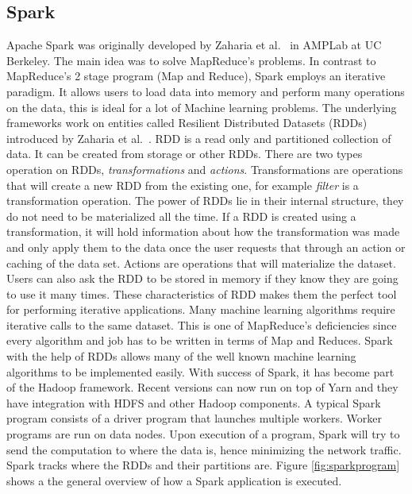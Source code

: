 \documentclass[english]{tktltiki}
\begin{document}
\subsection{Spark}
Apache Spark  was originally developed by Zaharia et al.\ \cite{zaharia10} in AMPLab at UC Berkeley. The main idea was to solve MapReduce's problems. In contrast to MapReduce's 2 stage program (Map and Reduce), Spark employs an iterative paradigm. It allows users to load data into memory and perform many operations on the data, this is ideal for a lot of Machine learning problems. The underlying frameworks work on entities called Resilient Distributed Datasets (RDDs) introduced by Zaharia et al.\ \cite{zaharia12}. RDD is a read only and partitioned collection of data. It can be created from storage or other RDDs. There are two types operation on RDDs, \textit{transformations} and \textit{actions}. Transformations are operations that will create a new RDD from the existing one, for example \textit{filter} is a transformation operation. The power of RDDs lie in their internal structure, they do not need to be materialized all the time. If a RDD is created using a transformation, it will hold information about how the transformation was made and only apply them to the data once the user requests that through an action or caching of the data set. Actions are operations that will materialize the dataset. Users can also ask the RDD to be stored in memory if they know they are going to use it many times. These characteristics of RDD makes them the perfect tool for performing iterative applications. Many machine learning algorithms require iterative calls to the same dataset. This is one of MapReduce's deficiencies since every algorithm and job has to be written in terms of Map and Reduces. Spark with the help of RDDs allows many of the well known machine learning algorithms to be implemented easily. With success of Spark, it has become part of the Hadoop framework. Recent versions can now run on top of Yarn and they have integration with HDFS and other Hadoop components. 
A typical Spark program consists of a driver program that launches multiple workers. Worker programs are run on data nodes. Upon execution of a program, Spark will try to send the computation to where the data is, hence minimizing the network traffic. Spark tracks where the RDDs and their partitions are. Figure \ref{fig:sparkprogram} shows a the general overview of how a Spark application is executed.
\end{document}
